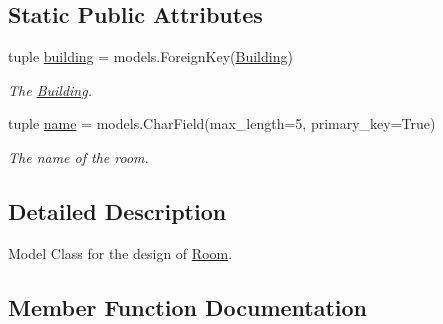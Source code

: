 \subsection*{Static Public Attributes}
\begin{DoxyCompactItemize}
\item 
\hypertarget{classrestriction__system_1_1models_1_1Room_afedcf2f9ce920962ad4d8b9488335089}{}tuple \hyperlink{classrestriction__system_1_1models_1_1Room_afedcf2f9ce920962ad4d8b9488335089}{building} = models.\+Foreign\+Key(\hyperlink{classrestriction__system_1_1models_1_1Building}{Building})\label{classrestriction__system_1_1models_1_1Room_afedcf2f9ce920962ad4d8b9488335089}

\begin{DoxyCompactList}\small\item\em The \hyperlink{classrestriction__system_1_1models_1_1Building}{Building}. \end{DoxyCompactList}\item 
\hypertarget{classrestriction__system_1_1models_1_1Room_aef4d82db166505ffe7727e4e098a2af6}{}tuple \hyperlink{classrestriction__system_1_1models_1_1Room_aef4d82db166505ffe7727e4e098a2af6}{name} = models.\+Char\+Field(max\+\_\+length=5, primary\+\_\+key=True)\label{classrestriction__system_1_1models_1_1Room_aef4d82db166505ffe7727e4e098a2af6}

\begin{DoxyCompactList}\small\item\em The name of the room. \end{DoxyCompactList}\end{DoxyCompactItemize}


\subsection{Detailed Description}
Model Class for the design of \hyperlink{classrestriction__system_1_1models_1_1Room}{Room}. 

\subsection{Member Function Documentation}
\hypertarget{classrestriction__system_1_1models_1_1Room_a1ccb980351b8038fdde3da7b0b89cae9}{}
